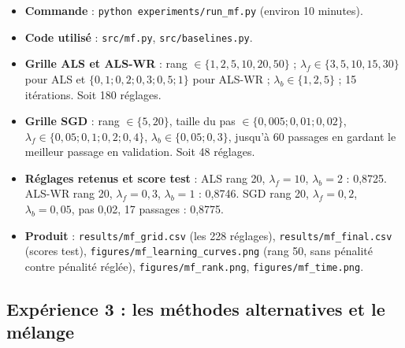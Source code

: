 \documentclass[11pt,a4paper]{article}
\begin{document}
\begin{itemize}
  \item \textbf{Commande} : \texttt{python experiments/run\_mf.py} (environ 10 minutes).
  \item \textbf{Code utilisé} : \texttt{src/mf.py}, \texttt{src/baselines.py}.
  \item \textbf{Grille ALS et ALS-WR} : rang $\in \{1, 2, 5, 10, 20, 50\}$ ;
        $\lambda_f \in \{3, 5, 10, 15, 30\}$ pour ALS et $\{0{,}1 ; 0{,}2 ; 0{,}3 ; 0{,}5 ; 1\}$
        pour ALS-WR ; $\lambda_b \in \{1, 2, 5\}$ ; 15 itérations. Soit 180 réglages.
  \item \textbf{Grille SGD} : rang $\in \{5, 20\}$, taille du pas $\in \{0{,}005 ; 0{,}01 ; 0{,}02\}$,
        $\lambda_f \in \{0{,}05 ; 0{,}1 ; 0{,}2 ; 0{,}4\}$, $\lambda_b \in \{0{,}05 ; 0{,}3\}$,
        jusqu'à 60 passages en gardant le meilleur passage en validation. Soit 48 réglages.
  \item \textbf{Réglages retenus et score test} : ALS rang 20, $\lambda_f = 10$,
        $\lambda_b = 2$ : 0,8725. ALS-WR rang 20, $\lambda_f = 0{,}3$, $\lambda_b = 1$ : 0,8746.
        SGD rang 20, $\lambda_f = 0{,}2$, $\lambda_b = 0{,}05$, pas 0,02, 17 passages : 0,8775.
  \item \textbf{Produit} : \texttt{results/mf\_grid.csv} (les 228 réglages),
        \texttt{results/mf\_final.csv} (scores test), \texttt{figures/mf\_learning\_curves.png}
        (rang 50, sans pénalité contre pénalité réglée), \texttt{figures/mf\_rank.png},
        \texttt{figures/mf\_time.png}.
\end{itemize}

\subsection{Expérience 3 : les méthodes alternatives et le mélange}
\end{document}
